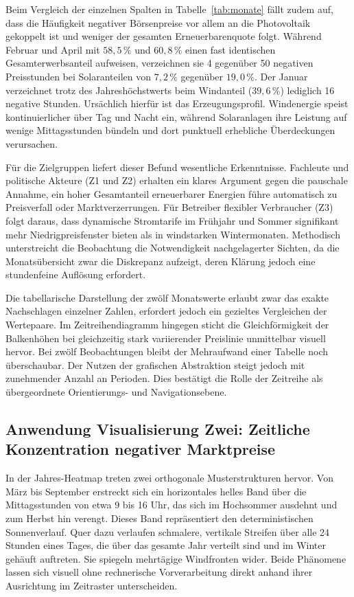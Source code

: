 Beim Vergleich der einzelnen Spalten in Tabelle~\ref{tab:monate} fällt zudem auf, dass die Häufigkeit negativer Börsenpreise vor allem an die Photovoltaik gekoppelt ist und weniger der gesamten Erneuerbarenquote folgt. Während Februar und April mit $58{,}5\,\%$ und $60{,}8\,\%$ einen fast identischen Gesamterwerbsanteil aufweisen, verzeichnen sie 4 gegenüber 50 negativen Preisstunden bei Solaranteilen von $7{,}2\,\%$ gegenüber $19{,}0\,\%$. Der Januar verzeichnet trotz des Jahreshöchstwerts beim Windanteil ($39{,}6\,\%$) lediglich 16 negative Stunden. Ursächlich hierfür ist das Erzeugungsprofil. Windenergie speist kontinuierlicher über Tag und Nacht ein, während Solaranlagen ihre Leistung auf wenige Mittagsstunden bündeln und dort punktuell erhebliche Überdeckungen verursachen.

Für die Zielgruppen liefert dieser Befund wesentliche Erkenntnisse. Fachleute und politische Akteure (Z1 und Z2) erhalten ein klares Argument gegen die pauschale Annahme, ein hoher Gesamtanteil erneuerbarer Energien führe automatisch zu Preisverfall oder Marktverzerrungen. Für Betreiber flexibler Verbraucher (Z3) folgt daraus, dass dynamische Stromtarife im Frühjahr und Sommer signifikant mehr Niedrigpreisfenster bieten als in windstarken Wintermonaten. Methodisch unterstreicht die Beobachtung die Notwendigkeit nachgelagerter Sichten, da die Monatsübersicht zwar die Diskrepanz aufzeigt, deren Klärung jedoch eine stundenfeine Auflösung erfordert.

Die tabellarische Darstellung der zwölf Monatswerte erlaubt zwar das exakte Nachschlagen einzelner Zahlen, erfordert jedoch ein gezieltes Vergleichen der Wertepaare. Im Zeitreihendiagramm hingegen sticht die Gleichförmigkeit der Balkenhöhen bei gleichzeitig stark variierender Preislinie unmittelbar visuell hervor. Bei zwölf Beobachtungen bleibt der Mehraufwand einer Tabelle noch überschaubar. Der Nutzen der grafischen Abstraktion steigt jedoch mit zunehmender Anzahl an Perioden. Dies bestätigt die Rolle der Zeitreihe als übergeordnete Orientierungs- und Navigationsebene.

\subsection{Anwendung Visualisierung Zwei: Zeitliche Konzentration negativer Marktpreise}\label{sec:anwendung2}

In der Jahres-Heatmap treten zwei orthogonale Musterstrukturen hervor. Von März bis September erstreckt sich ein horizontales helles Band über die Mittagsstunden von etwa 9 bis 16 Uhr, das sich im Hochsommer ausdehnt und zum Herbst hin verengt. Dieses Band repräsentiert den deterministischen Sonnenverlauf. Quer dazu verlaufen schmalere, vertikale Streifen über alle 24 Stunden eines Tages, die über das gesamte Jahr verteilt sind und im Winter gehäuft auftreten. Sie spiegeln mehrtägige Windfronten wider. Beide Phänomene lassen sich visuell ohne rechnerische Vorverarbeitung direkt anhand ihrer Ausrichtung im Zeitraster unterscheiden.

